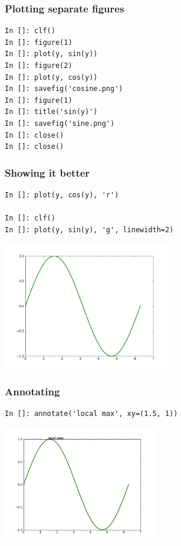 \documentclass[14pt,compress]{beamer}
\newcounter{time}
\newcommand{\inctime}[1]{\addtocounter{time}{#1}{\tiny \thetime\ m}}
\begin{document}
\begin{frame}[fragile]
\frametitle{Plotting separate figures}
\begin{lstlisting}
In []: clf()
In []: figure(1)
In []: plot(y, sin(y))
In []: figure(2)
In []: plot(y, cos(y))
In []: savefig('cosine.png')
In []: figure(1)
In []: title('sin(y)')
In []: savefig('sine.png')
In []: close()
In []: close()
\end{lstlisting}
\end{frame}

\begin{frame}[fragile]
\frametitle{Showing it better}
\vspace{-0.15in}
\begin{lstlisting}
In []: plot(y, cos(y), 'r')

In []: clf()
In []: plot(y, sin(y), 'g', linewidth=2)
\end{lstlisting}
\vspace*{-0.2in}
\begin{center}
  \includegraphics[height=2.2in, interpolate=true]{data/green}  
\end{center}
\end{frame}

\begin{frame}[fragile]
\frametitle{Annotating}
\vspace*{-0.15in}
\begin{lstlisting}
In []: annotate('local max', xy=(1.5, 1))
\end{lstlisting}
\vspace*{-0.2in}
\begin{center}
  \includegraphics[height=2in, interpolate=true]{data/annotate}  
\end{center}
\end{frame}
\end{document}
